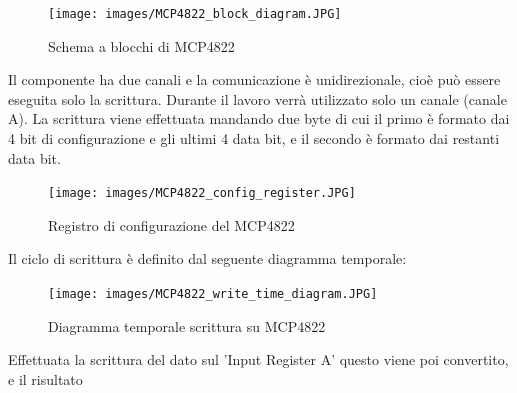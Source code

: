 \documentclass[12pt, a4paper, titlepage, oneside]{book}
\begin{document}
\begin{figure} [h]
    \centering
    \texttt{[image: images/MCP4822\_block\_diagram.JPG]}
    \caption{Schema a blocchi di MCP4822}
    \label{fig: MCP4822 BLOCK DIAGRAM}
\end{figure}

Il componente ha due canali e la comunicazione è unidirezionale, cioè può essere eseguita solo la scrittura.\newline
Durante il lavoro verrà utilizzato solo un canale (canale A).\newline
\newpage
La scrittura viene effettuata mandando due byte di cui il primo è formato dai 4 bit di configurazione e gli ultimi 4 data bit, e il secondo è formato dai restanti data bit.\newline
\begin{figure}[h]
    \centering
    \texttt{[image: images/MCP4822\_config\_register.JPG]}
    \caption{Registro di configurazione del MCP4822}
    \label{fig:MCP4822_CONF_REGISTER}
\end{figure}
Il ciclo di scrittura è definito dal seguente diagramma temporale:
\begin{figure}[h]
    \centering
    \texttt{[image: images/MCP4822\_write\_time\_diagram.JPG]}
    \caption{Diagramma temporale scrittura su MCP4822}
    \label{fig:MCP4822 TIME DIAGRAM}
\end{figure}

Effettuata la scrittura del dato sul 'Input Register A' questo viene poi convertito, e il risultato 
\newpage
\end{document}
